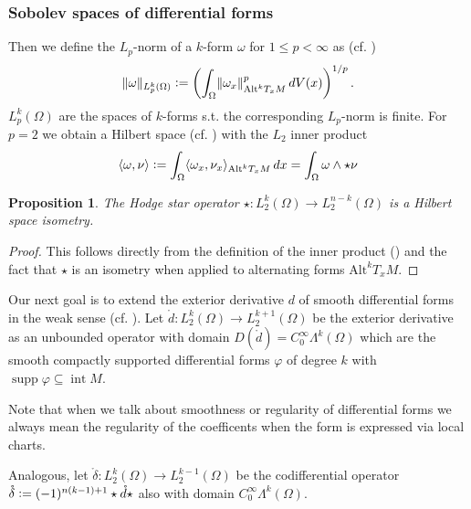 \documentclass[12pt,a4paper]{article}
\numberwithin{equation}{subsection}
\numberwithin{lemma}{subsection}
\newtheorem{proposition}[lemma]{Proposition}
\theoremstyle{definition}
\DeclareMathOperator{\interior}{int}
\DeclareMathOperator{\supp}{supp}
\newcommand{\smoothcompforms}[2]{C_0^\infty \Lambda^{#1}(#2)}
\begin{document}
\subsubsection{Sobolev spaces of differential forms}

Then
we define the $L_p$-norm of a $k$-form $\omega$ for $1\leq p < \infty$
as (cf. \cite{goldshtein})
\begin{align*}
\lVert \omega \rVert _{L_p^k(\Omega)}\vcentcolon=
\left(\int_\Omega \lVert \omega_x \rVert _{\text{Alt}^k T_x M}^p 
    \,dV(x) \right)^{1/p}.
\end{align*}
$L_p^k(\Omega)$ are the spaces of $k$-forms 
s.t. the corresponding $L_p$-norm is finite.
For $p=2$ we obtain a Hilbert space (cf. \cite[Sec. 6.2.6]{arnold}) 
with the $L_2$ inner product  
\begin{align}
    \langle \omega, \nu \rangle \vcentcolon= 
    \int_\Omega \langle \omega_x, \nu_x \rangle _{\text{Alt}^k T_x M} \,dx
    = \int_\Omega \omega \wedge \star \nu
    \label{eq:def_inner_product} 
\end{align}
\begin{proposition}
    The Hodge star operator $\star:L^k_2(\Omega) \rightarrow L^{n-k}_2(\Omega)$ is a
    Hilbert space isometry.
\end{proposition}
\begin{proof}
    This follows directly from the definition of the inner product 
    () and the fact that $\star$ is an isometry 
    when applied to alternating forms $\text{Alt}^k T_x M$.
\end{proof}


Our next goal is to extend the exterior derivative $d$ 
of smooth differential forms in the weak sense (cf. \cite{goldshtein}). 
Let $\mathring{d}: L^k_2(\Omega) \rightarrow L^{k+1}_2(\Omega)$ be the exterior
derivative as an unbounded operator with domain 
$D(\mathring{d}) = \smoothcompforms{k}{\Omega}$ 
which are the smooth compactly supported differential forms $\varphi$ 
of degree $k$
with $\supp \varphi \subseteq \interior M$.

Note that when we talk about smoothness or regularity of differential forms we
always mean the regularity of the coefficents when the form is expressed 
via local charts. 

Analogous, let 
$\mathring{\delta}: L^k_2(\Omega) \rightarrow L^{k-1}_2(\Omega)$ be the 
codifferential operator $\mathring{\delta} \vcentcolon= 
(-1)^{n(k-1)+1}\star\mathring{d}\star$ 
also with domain $\smoothcompforms{k}{\Omega}$. 
\end{document}
